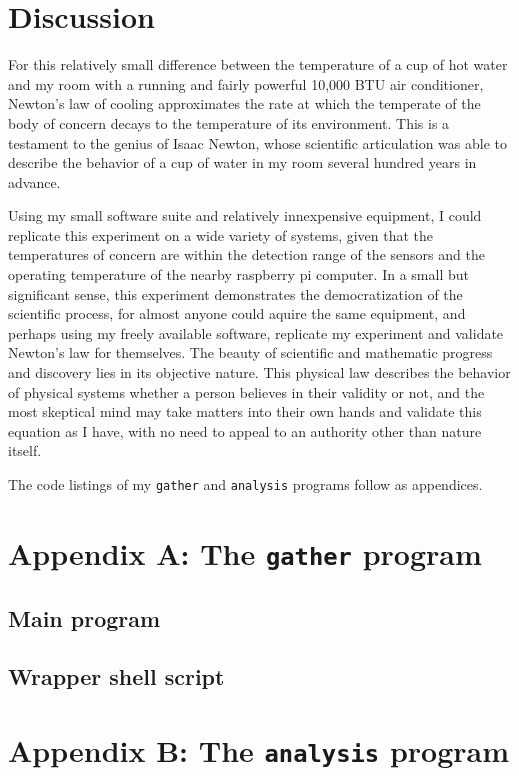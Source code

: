 \documentclass[12pt]{article}
\begin{document}
\section{Discussion}

For this relatively small difference
between the temperature of a cup of hot water
and my room with a running and fairly powerful 10,000 BTU air conditioner,
Newton's law of cooling approximates
the rate at which the temperate of the body of concern
decays to the temperature of its environment.
This is a testament to the genius of Isaac Newton,
whose scientific articulation was able to describe
the behavior of a cup of water in my room
several hundred years in advance.

Using my small software suite
and relatively innexpensive equipment,
I could replicate this experiment
on a wide variety of systems,
given that the temperatures of concern
are within the detection range of the sensors
and the operating temperature of the nearby
raspberry pi computer.
In a small but significant sense,
this experiment demonstrates the democratization of the scientific process,
for almost anyone could aquire the same equipment,
and perhaps using my freely available software,
replicate my experiment and validate Newton's law for themselves.
The beauty of scientific and mathematic progress and discovery
lies in its objective nature.
This physical law describes the behavior of physical systems
whether a person believes in their validity or not,
and the most skeptical mind may take matters into their own hands
and validate this equation as I have,
with no need to appeal to an authority other than nature itself.

\medskip
\noindent
The code listings of my \texttt{gather} and \texttt{analysis} programs follow as appendices.

\section{Appendix A: The \texttt{gather} program} \label{apxA}

\subsection{Main program}



\subsection{Wrapper shell script}



\section{Appendix B: The \texttt{analysis} program} \label{apxB}





\end{document}
